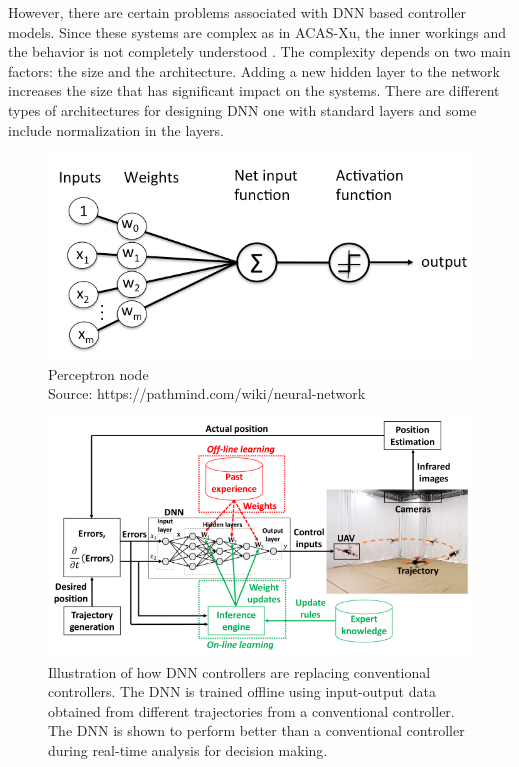 However,  there are certain  problems associated with \ac{DNN} based controller models. 
Since these systems are complex as in \ac{ACAS-Xu}, the inner workings and the behavior is not completely understood . 
The complexity depends on  two main factors: the size and the architecture.
Adding a new hidden layer to the network increases the size that has  significant impact on the systems.   
There are different types of architectures for designing \ac{DNN} one with standard layers and some include normalization in the layers. 


\begin{figure}
	\centering
	\includegraphics[width=0.7\linewidth]{Images/perceptron_node}
	\caption{Perceptron node  \\ Source: https://pathmind.com/wiki/neural-network}
	\label{fig:perceptronnode}
\end{figure}

\begin{figure}
	\centering
	\includegraphics[width=0.7\linewidth]{Images/DNNcontroller}
	\caption{Illustration of how DNN controllers are replacing conventional controllers. The DNN is trained offline using input-output data obtained from different trajectories from a conventional controller. The DNN is shown to perform better than a conventional controller during real-time analysis for decision making.}
	\label{fig:dnncontroller}
\end{figure}

